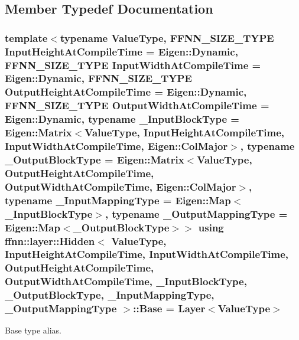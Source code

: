 \subsection{Member Typedef Documentation}
\hypertarget{classffnn_1_1layer_1_1_hidden_ac51b180aa7de47794148e32616f0441f}{
\subsubsection[{Base}]{\setlength{\rightskip}{0pt plus 5cm}template$<$typename Value\-Type, F\-F\-N\-N\-\_\-\-S\-I\-Z\-E\-\_\-\-T\-Y\-P\-E Input\-Height\-At\-Compile\-Time = Eigen\-::\-Dynamic, F\-F\-N\-N\-\_\-\-S\-I\-Z\-E\-\_\-\-T\-Y\-P\-E Input\-Width\-At\-Compile\-Time = Eigen\-::\-Dynamic, F\-F\-N\-N\-\_\-\-S\-I\-Z\-E\-\_\-\-T\-Y\-P\-E Output\-Height\-At\-Compile\-Time = Eigen\-::\-Dynamic, F\-F\-N\-N\-\_\-\-S\-I\-Z\-E\-\_\-\-T\-Y\-P\-E Output\-Width\-At\-Compile\-Time = Eigen\-::\-Dynamic, typename \-\_\-\-Input\-Block\-Type = Eigen\-::\-Matrix$<$\-Value\-Type, Input\-Height\-At\-Compile\-Time, Input\-Width\-At\-Compile\-Time, Eigen\-::\-Col\-Major$>$, typename \-\_\-\-Output\-Block\-Type = Eigen\-::\-Matrix$<$\-Value\-Type, Output\-Height\-At\-Compile\-Time, Output\-Width\-At\-Compile\-Time, Eigen\-::\-Col\-Major$>$, typename \-\_\-\-Input\-Mapping\-Type = Eigen\-::\-Map$<$\-\_\-\-Input\-Block\-Type$>$, typename \-\_\-\-Output\-Mapping\-Type = Eigen\-::\-Map$<$\-\_\-\-Output\-Block\-Type$>$$>$ using {\bf ffnn\-::layer\-::\-Hidden}$<$ Value\-Type, Input\-Height\-At\-Compile\-Time, Input\-Width\-At\-Compile\-Time, Output\-Height\-At\-Compile\-Time, Output\-Width\-At\-Compile\-Time, \-\_\-\-Input\-Block\-Type, \-\_\-\-Output\-Block\-Type, \-\_\-\-Input\-Mapping\-Type, \-\_\-\-Output\-Mapping\-Type $>$\-::{\bf Base} =  {\bf Layer}$<$Value\-Type$>$}}\label{classffnn_1_1layer_1_1_hidden_ac51b180aa7de47794148e32616f0441f}


Base type alias. 

